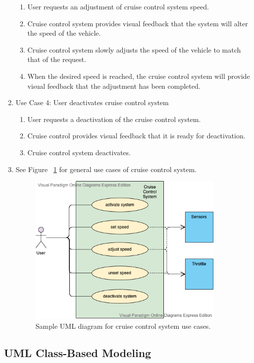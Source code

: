 \documentclass[preprint,11pt,3p]{article}
\begin{document}
\begin{enumerate}
\begin{enumerate}
			\item User requests an adjustment of cruise control system speed.
			\item Cruise control system provides visual feedback that the system will alter the speed of the vehicle.
			\item Cruise control system slowly adjusts the speed of the vehicle to match that of the request.
			\item When the desired speed is reached, the cruise control system will provide visual feedback that the adjustment has been completed.
		\end{enumerate}
	\item Use Case 4: User deactivates cruise control system
		\begin{enumerate}
			\item User requests a deactivation of the cruise control system.
			\item Cruise control provides visual feedback that it is ready for deactivation.
			\item Cruise control system deactivates.
		\end{enumerate}
	\item See Figure ~\ref{fig:ccUML1} for general use cases of cruise control system.
		\begin{figure}[H]
			\includegraphics[width=0.9\textwidth]{images/useCaseUML.png}
			\caption{Sample UML diagram for cruise control system use cases.}
			\label{fig:ccUML1}
		\end{figure}
\end{enumerate}

\subsection{UML Class-Based Modeling}
\end{document}
